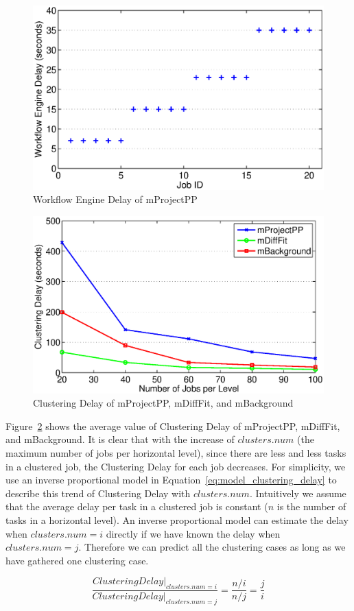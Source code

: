 \begin{figure}
\centering
  \includegraphics[width=0.7\linewidth]{figures/model/montage_one_run.eps}
    \caption{Workflow Engine Delay of mProjectPP}
    \label{fig:model_montage_one_run}
\end{figure}%
\begin{figure}
  \centering
  \includegraphics[width=0.7\linewidth]{figures/model/montage_clustering_delay.eps}
    \caption{Clustering Delay of mProjectPP, mDiffFit, and mBackground}
    \label{fig:model_montage_clustering}
\end{figure}





Figure~\ref{fig:model_montage_clustering} shows the average value of Clustering Delay of mProjectPP, mDiffFit, and mBackground. It is clear that with the increase of $clusters.num$ (the maximum number of jobs per horizontal level), since there are less and less tasks in a clustered job, the Clustering Delay for each job decreases. For simplicity, we use an inverse proportional model in Equation~\ref{eq:model_clustering_delay} to describe this trend of Clustering Delay with $clusters.num$. Intuitively we assume that the average delay per task in a clustered job is constant ($n$ is the number of tasks in a horizontal level). An inverse proportional model can estimate the delay when $clusters.num=i$ directly if we have known the delay when $clusters.num=j$. Therefore we can predict all the clustering cases as long as we have gathered one clustering case. 

\begin{equation} \label{eq:model_clustering_delay}
\frac{Clustering Delay|_{clusters.num=i}}{Clustering Delay|_{clusters.num=j}}=\frac{n/i}{n/j}=\frac{j}{i}
\end{equation}




